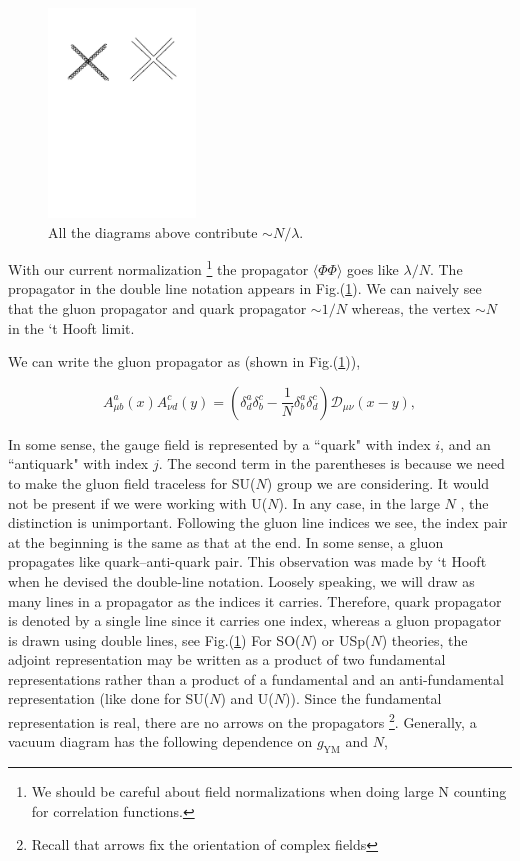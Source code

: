 \begin{figure}
\begin{center}\includegraphics[width=0.35\textwidth]{./Figures/DL3}\end{center}
\caption{\label{fig:dl2}All the diagrams above contribute $\sim N/\lambda$.}
\end{figure}

With our current normalization 
\footnote{We should be careful about field normalizations when doing large N counting for correlation functions. } 
the propagator $\langle \Phi \Phi \rangle$ goes like $\lambda/N$. The propagator in the double line notation appears in Fig.(\ref{fig:dl2}). 
We can naively see that the gluon propagator and quark propagator $ \sim 1/N$ 
whereas, the vertex $ \sim N$ in the `t Hooft limit. 

We can write the gluon propagator as (shown in Fig.(\ref{fig:dl2})), 

\begin{equation}
  \label{eq:gluon}
   A^{a}_{\mu b}(x) A^{c}_{\nu d}(y) = \left ( \delta^{a}_{d}\delta^{c}_{b} - \frac{1}{N} \delta^{a}_{b}\delta^{c}_{d}\right)
   \mathscr{D}_{\mu\nu}(x-y) , 
\end{equation}

In some sense, the gauge field is represented by a ``quark" with index $i$, and an ``antiquark" with index $j$. 
The second term in the parentheses is because we need to make the gluon field traceless for SU($N$) group we are
considering. It would not be present if we were working with U($N$). In any case, in the large $N$ , the distinction is unimportant.  
Following the gluon line indices we see, the index pair at the beginning is the same as that at the end. In some sense, 
a gluon propagates like quark--anti-quark pair. This observation was made by `t Hooft when he devised the double-line 
notation. Loosely speaking, we will draw as many lines in a propagator as the indices it carries. Therefore, quark propagator 
is denoted by a single line since it carries one index, whereas a gluon propagator is drawn using double lines, see Fig.(\ref{fig:dl2})
For SO($N$) or USp($N$) theories, the adjoint representation may be written as a product of two fundamental representations 
rather than a product of a fundamental and an anti-fundamental representation (like done for SU($N$) and U($N$)). Since the
fundamental representation is real, there are no arrows on the propagators \footnote{Recall that arrows fix the orientation of complex fields}. 
Generally, a vacuum diagram has the following dependence on $g_{\text{YM}}$ and $N$, 

